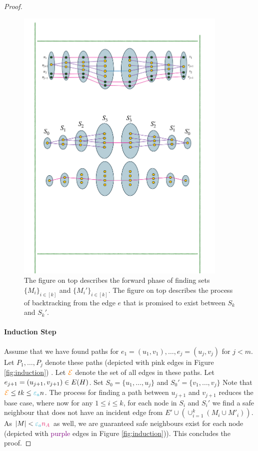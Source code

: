 \documentclass[11pt]{article}
\newcommand{\epsilonA}{\textcolor{ballblue}{\epsilon_a}}
\newcommand{\na}{\textcolor{razzmatazz}{n_A}}
\begin{document}
\begin{proof}
\begin{figure}
	\includegraphics[width=0.9\textwidth
	]{assets/BaseA.pdf}
	\caption{The figure on top describes the forward phase of finding sets $\{M_i\}_{i\in [k]}$ and $\{M_i'\}_{i\in [k]}$. The figure on top describes the process of backtracking from the edge $e$ that is promised to exist between $S_k$ and $S_k'$.}
	\label{fig:baseB}
\end{figure}



\paragraph{Induction Step}
	
Assume that we have found paths for $e_1 = (u_1, v_1), \dots, e_j=(u_j, v_j)$ for $j < m$.
Let $P_1, \dots, P_j$ denote these paths (depicted with \textcolor{carminepink}{pink} edges in Figure \ref{fig:induction}) .
Let $\textcolor{orange}{\mathcal{E}}$ denote the set of all edges in these paths.
Let $e_{j+1} = (u_{j+1},v_{j+1}) \in E(H)$.
Set $S_0 = \{u_1, \dots, u_j\}$ and $S_0' = \{v_1, \dots, v_j\}$
Note that $\GlobalEdgeSet \leq tk \leq \epsilonA n$.
The process for finding a path between $u_{j+1}$ and $v_{j+1}$ reduces the base case, where now for any $1 \leq i \leq k$, for each node in $S_i$ and $S_i'$ we find a safe neighbour that does not have an incident  edge from $E' \cup (\cup_{i=1}^k (M_i \cup M'_i))$. As $|M| < \epsilonA\na$ as well, we are guaranteed safe neighbours exist for each node (depicted with \textcolor{purple}{purple} edges in Figure \ref{fig:induction})).
This concludes the proof.


\end{proof}
\end{document}
